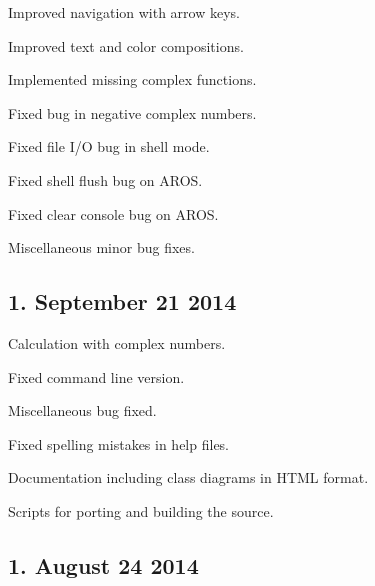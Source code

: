 \begin{DoxyItemize}
\item Improved navigation with arrow keys.
\item Improved text and color compositions.
\item Implemented missing complex functions.
\item Fixed bug in negative complex numbers.
\item Fixed file I/O bug in shell mode.
\item Fixed shell flush bug on A\+R\+OS.
\item Fixed clear console bug on A\+R\+OS.
\item Miscellaneous minor bug fixes.
\end{DoxyItemize}\hypertarget{release_page_version15}{}\subsection{1. September 21 2014}\label{release_page_version15}

\begin{DoxyItemize}
\item Calculation with complex numbers.
\item Fixed command line version.
\item Miscellaneous bug fixed.
\item Fixed spelling mistakes in help files.
\item Documentation including class diagrams in H\+T\+ML format.
\item Scripts for porting and building the source.
\end{DoxyItemize}\hypertarget{release_page_version14}{}\subsection{1. August 24 2014}\label{release_page_version14}

